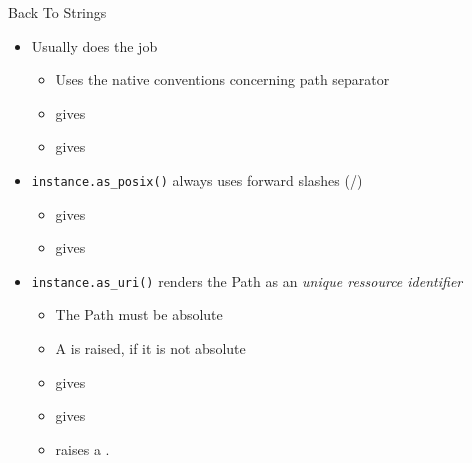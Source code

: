 \begin{frame}{Back To Strings}
%
\begin{itemize}
\item {} Usually does the job
	\begin{itemize}
	\item Uses the native conventions concerning path separator
	\item {} gives 
	\item {} gives 
	\end{itemize}
\item \texttt{instance.as\_posix()} always uses forward slashes (/)
	\begin{itemize}
	\item {} gives 
	\item {} gives 
	\end{itemize}
\item \texttt{instance.as\_uri()} renders the Path as an \emph{unique ressource identifier}
	\begin{itemize}
	\item The Path must be absolute
	\item A  is raised, if it is not absolute
	\item {} gives 
	\item {} gives 
	\item {} raises a .
	\end{itemize}
\end{itemize}
%
\end{frame}


